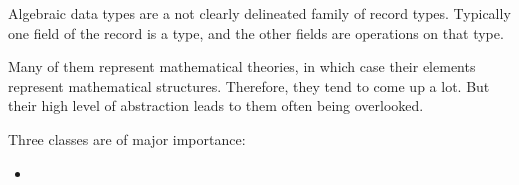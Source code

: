 Algebraic data types are a not clearly delineated family of record types.
Typically one field of the record is a type, and the other fields are operations on that type.

Many of them represent mathematical theories, in which case their elements represent mathematical structures.
Therefore, they tend to come up a lot.
But their high level of abstraction leads to them often being overlooked.

Three classes are of major importance:
\begin{itemize}
\item 
\end{itemize}


